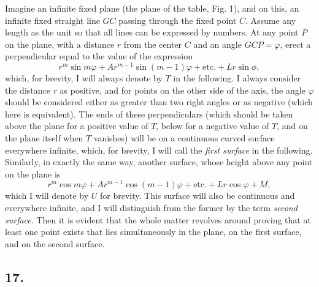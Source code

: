 \documentclass[12pt]{memoir}
\theoremstyle{plain}
\theoremstyle{remark}
\begin{document}
Imagine an infinite fixed plane (the plane of the table, Fig. 1), and on this, an infinite fixed straight line \(GC\) passing through the fixed point \(C\). Assume any length as the unit so that all lines can be expressed by numbers.  At any point \(P\) on the plane, with a distance \(r\) from the center \(C\) and an angle \(GCP = \varphi\), erect a perpendicular equal to the value of the expression \[ r^m \sin m \varphi + A r^{m-1} \sin(m-1)\varphi + \text{etc.} + L r\sin \phi, \] which, for brevity, I will always denote by \(T\) in the following. I always consider the distance \(r\) as positive, and for points on the other side of the axis, the angle \(\varphi\) should be considered either as greater than two right angles or as negative (which here is equivalent). The ends of these perpendiculars (which should be taken above the plane for a positive value of \(T\), below for a negative value of \(T\), and on the plane itself when \(T\) vanishes) will be on a continuous curved surface everywhere infinite, which, for brevity, I will call the \textit{first surface} in the following. Similarly, in exactly the same way, another surface, whose height above any point on the plane is \[r^m\cos m\varphi + Ar^{m-1}\cos(m-1)\varphi + \text{etc.}+Lr\cos\varphi+M,\] which I will denote by \(U\) for brevity. This surface will also be continuous and everywhere infinite, and I will distinguish from the former by the term \textit{second surface}. Then it is evident that the whole matter revolves around proving that at least one point exists that lies simultaneously in the plane, on the first surface, and on the second surface.

\subsection*{17.}
\end{document}
